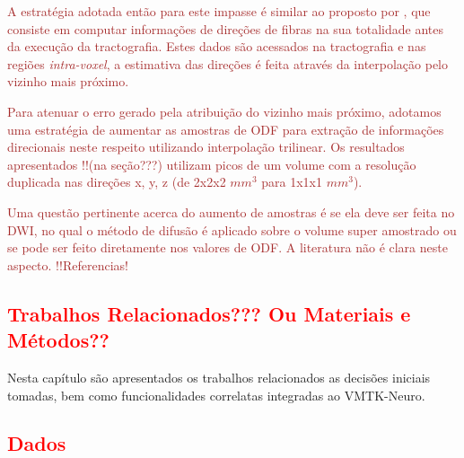 \documentclass[
    12pt,                %
    oneside,            %
    a4paper,            %
    english,            %
    french,                %
    spanish,            %
    brazil                %
    ]{abntex2}
\begin{document}


\textcolor{brown}{
A estratégia adotada então para este impasse é similar ao proposto por , que consiste em computar informações de direções de fibras na sua totalidade antes da execução da tractografia. Estes dados são acessados na tractografia e nas regiões \textit{intra-voxel}, a estimativa das direções é feita através da interpolação pelo vizinho mais próximo.
}

\textcolor{brown}{
Para atenuar o erro gerado pela atribuição do vizinho mais próximo, adotamos uma estratégia de aumentar as amostras de ODF para extração de informações direcionais neste respeito utilizando interpolação trilinear. Os resultados apresentados !!(na seção???) utilizam picos de um volume com a resolução duplicada nas direções x, y, z (de 2x2x2 $mm^3$ para 1x1x1 $mm^3$).
}

\textcolor{brown}{
Uma questão pertinente acerca do aumento de amostras é se ela deve ser feita no DWI, no qual o método de difusão é aplicado sobre o volume super amostrado ou se pode ser feito diretamente nos valores de ODF. A literatura não é clara neste aspecto. !!Referencias!
}



\textcolor{red}{
\chapter{Trabalhos Relacionados??? Ou Materiais e Métodos??}
\label{cap:metodos}
}


Nesta capítulo são apresentados os trabalhos relacionados as decisões iniciais tomadas, bem como funcionalidades correlatas integradas ao VMTK-Neuro.

\textcolor{red}{
\section{Dados}
}
\end{document}
